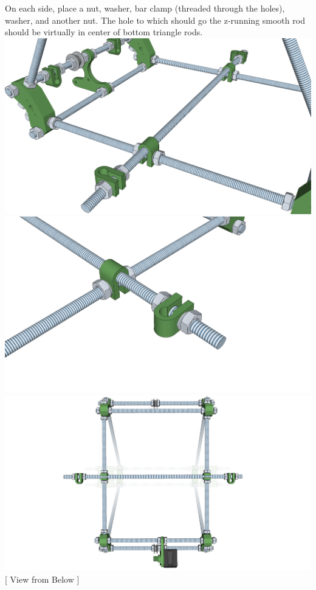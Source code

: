 \documentclass[twoside,openany,a4paper,titlepage]{memoir}
\begin{document}
	\section{}
	On each side, place a nut, washer, bar clamp (threaded through the holes), washer, and another nut.
	The hole to which should go the z-running smooth rod should be virtually in center of bottom triangle
	rods.\\
	\includegraphics[width=1\linewidth]{graphics/ch5_6_1.png}
	\includegraphics[width=1\linewidth]{graphics/ch5_6_2.png}
	\includegraphics[width=1\linewidth]{graphics/ch5_6_3.png}
	[ View from Below ]
	
\end{document}
